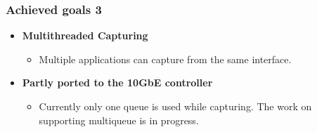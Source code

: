 \begin{frame}
\frametitle{Achieved goals 3}
\begin{itemize}
	\item \textbf{Multithreaded Capturing}
		\begin{itemize}
			\item Multiple applications can capture from the same interface. 
		\end{itemize}
	\item \textbf{Partly ported to the 10GbE controller}
		\begin{itemize}
			\item Currently only one queue is used while capturing. The work on
				supporting multiqueue is in progress.
		\end{itemize}
\end{itemize}
\end{frame}

